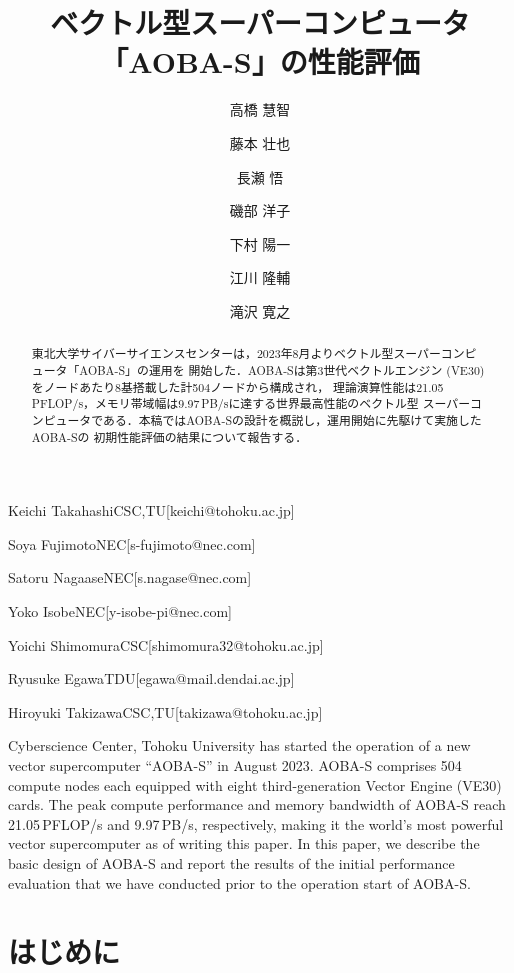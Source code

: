 ﻿\documentclass[submit,techrep,noauthor]{ipsj}
\begin{document}
\title{ベクトル型スーパーコンピュータ「AOBA-S」の性能評価}



\author{高橋 慧智}{Keichi Takahashi}{CSC,TU}[keichi@tohoku.ac.jp]
\author{藤本 壮也}{Soya Fujimoto}{NEC}[s-fujimoto@nec.com]
\author{長瀬 悟}{Satoru Nagaase}{NEC}[s.nagase@nec.com]
\author{磯部 洋子}{Yoko Isobe}{NEC}[y-isobe-pi@nec.com]
\author{下村 陽一}{Yoichi Shimomura}{CSC}[shimomura32@tohoku.ac.jp]
\author{江川 隆輔}{Ryusuke Egawa}{TDU}[egawa@mail.dendai.ac.jp]
\author{滝沢 寛之}{Hiroyuki Takizawa}{CSC,TU}[takizawa@tohoku.ac.jp]

\begin{abstract}
東北大学サイバーサイエンスセンターは，2023年8月よりベクトル型スーパーコンピュータ「AOBA-S」の運用を
開始した．AOBA-Sは第3世代ベクトルエンジン (VE30) をノードあたり8基搭載した計504ノードから構成され，
理論演算性能は21.05\,PFLOP/s，メモリ帯域幅は9.97\,PB/sに達する世界最高性能のベクトル型
スーパーコンピュータである．本稿ではAOBA-Sの設計を概説し，運用開始に先駆けて実施したAOBA-Sの
初期性能評価の結果について報告する．
\end{abstract}

\begin{eabstract}
Cyberscience Center, Tohoku University has started the operation of a new vector supercomputer 
``AOBA-S'' in August 2023. AOBA-S comprises 504 compute nodes each equipped with eight
third-generation Vector Engine (VE30) cards. The peak compute performance and memory bandwidth of
AOBA-S reach 21.05\,PFLOP/s and 9.97\,PB/s, respectively, making it the world's most powerful vector
supercomputer as of writing this paper. In this paper, we describe the basic design of AOBA-S and
report the results of the initial performance evaluation that we have conducted prior to the
operation start of AOBA-S.
\end{eabstract}

\maketitle

\section{はじめに}
\end{document}
